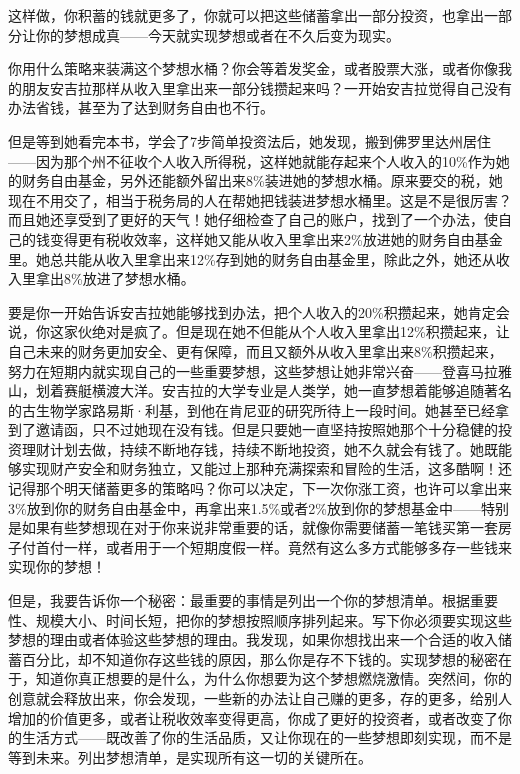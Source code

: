 这样做，你积蓄的钱就更多了，你就可以把这些储蓄拿出一部分投资，也拿出一部分让你的梦想成真——今天就实现梦想或者在不久后变为现实。

你用什么策略来装满这个梦想水桶？你会等着发奖金，或者股票大涨，或者你像我的朋友安吉拉那样从收入里拿出来一部分钱攒起来吗？一开始安吉拉觉得自己没有办法省钱，甚至为了达到财务自由也不行。

但是等到她看完本书，学会了7步简单投资法后，她发现，搬到佛罗里达州居住——因为那个州不征收个人收入所得税，这样她就能存起来个人收入的10\%作为她的财务自由基金，另外还能额外留出来8\%装进她的梦想水桶。原来要交的税，她现在不用交了，相当于税务局的人在帮她把钱装进梦想水桶里。这是不是很厉害？而且她还享受到了更好的天气！她仔细检查了自己的账户，找到了一个办法，使自己的钱变得更有税收效率，这样她又能从收入里拿出来2\%放进她的财务自由基金里。她总共能从收入里拿出来12\%存到她的财务自由基金里，除此之外，她还从收入里拿出8\%放进了梦想水桶。

要是你一开始告诉安吉拉她能够找到办法，把个人收入的20\%积攒起来，她肯定会说，你这家伙绝对是疯了。但是现在她不但能从个人收入里拿出12\%积攒起来，让自己未来的财务更加安全、更有保障，而且又额外从收入里拿出来8\%积攒起来，努力在短期内就实现自己的一些重要梦想，这些梦想让她非常兴奋——登喜马拉雅山，划着赛艇横渡大洋。安吉拉的大学专业是人类学，她一直梦想着能够追随著名的古生物学家路易斯·利基，到他在肯尼亚的研究所待上一段时间。她甚至已经拿到了邀请函，只不过她现在没有钱。但是只要她一直坚持按照她那个十分稳健的投资理财计划去做，持续不断地存钱，持续不断地投资，她不久就会有钱了。她既能够实现财产安全和财务独立，又能过上那种充满探索和冒险的生活，这多酷啊！还记得那个明天储蓄更多的策略吗？你可以决定，下一次你涨工资，也许可以拿出来3\%放到你的财务自由基金中，再拿出来1.5\%或者2\%放到你的梦想基金中——特别是如果有些梦想现在对于你来说非常重要的话，就像你需要储蓄一笔钱买第一套房子付首付一样，或者用于一个短期度假一样。竟然有这么多方式能够多存一些钱来实现你的梦想！

但是，我要告诉你一个秘密：最重要的事情是列出一个你的梦想清单。根据重要性、规模大小、时间长短，把你的梦想按照顺序排列起来。写下你必须要实现这些梦想的理由或者体验这些梦想的理由。我发现，如果你想找出来一个合适的收入储蓄百分比，却不知道你存这些钱的原因，那么你是存不下钱的。实现梦想的秘密在于，知道你真正想要的是什么，为什么你想要为这个梦想燃烧激情。突然间，你的创意就会释放出来，你会发现，一些新的办法让自己赚的更多，存的更多，给别人增加的价值更多，或者让税收效率变得更高，你成了更好的投资者，或者改变了你的生活方式——既改善了你的生活品质，又让你现在的一些梦想即刻实现，而不是等到未来。列出梦想清单，是实现所有这一切的关键所在。

